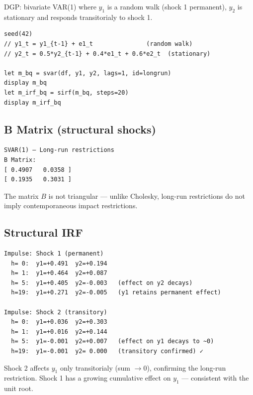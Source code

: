 DGP: bivariate VAR(1) where $y_1$ is a random walk (shock 1 permanent),
$y_2$ is stationary and responds transitorialy to shock 1.

\begin{lstlisting}[caption={SVAR Blanchard-Quah}]
seed(42)
// y1_t = y1_{t-1} + e1_t               (random walk)
// y2_t = 0.5*y2_{t-1} + 0.4*e1_t + 0.6*e2_t  (stationary)

let m_bq = svar(df, y1, y2, lags=1, id=longrun)
display m_bq
let m_irf_bq = sirf(m_bq, steps=20)
display m_irf_bq
\end{lstlisting}

\subsection*{B Matrix (structural shocks)}

\begin{lstlisting}[language={}, basicstyle=\ttfamily\small, frame=none,
  numbers=none, backgroundcolor=\color{codbg}]
SVAR(1) — Long-run restrictions
B Matrix:
[ 0.4907   0.0358 ]
[ 0.1935   0.3031 ]
\end{lstlisting}

The matrix $B$ is not triangular — unlike Cholesky, long-run restrictions
do not imply contemporaneous impact restrictions.

\subsection*{Structural IRF}

\begin{lstlisting}[language={}, basicstyle=\ttfamily\small, frame=none,
  numbers=none, backgroundcolor=\color{codbg}]
Impulse: Shock 1 (permanent)
  h= 0:  y1=+0.491  y2=+0.194
  h= 1:  y1=+0.464  y2=+0.087
  h= 5:  y1=+0.405  y2=-0.003   (effect on y2 decays)
  h=19:  y1=+0.271  y2=-0.005   (y1 retains permanent effect)

Impulse: Shock 2 (transitory)
  h= 0:  y1=+0.036  y2=+0.303
  h= 1:  y1=+0.016  y2=+0.144
  h= 5:  y1=-0.001  y2=+0.007   (effect on y1 decays to ~0)
  h=19:  y1=-0.001  y2= 0.000   (transitory confirmed) ✓
\end{lstlisting}

Shock 2 affects $y_1$ only transitorialy (sum $\to 0$), confirming the
long-run restriction. Shock 1 has a growing cumulative effect on $y_1$
— consistent with the unit root.

